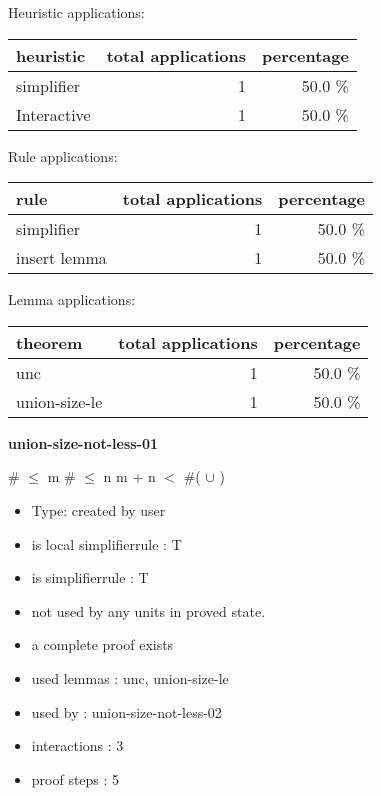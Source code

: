 \documentclass[a4paper]{article}
\begin{document}
\medskip


Heuristic applications:

\begin{supertabular}{l|r|r}
heuristic	& total applications & percentage \\ \hline
simplifier & 1 & 50.0 \% \\
Interactive & 1 & 50.0 \% \\

\end{supertabular}

Rule applications:

\begin{supertabular}{l|r|r}
rule	        & total applications & percentage \\ \hline
simplifier & 1 & 50.0 \% \\
insert lemma & 1 & 50.0 \% \\

\end{supertabular}

Lemma applications:

\begin{supertabular}{l|r|r}
theorem	        & total applications & percentage \\ \hline
unc & 1 & 50.0 \% \\
union-size-le & 1 & 50.0 \% \\

\end{supertabular}
\pagebreak

{\LARGE\bf union-size-not-less-01}\label{lemma-union-size-not-less-01}

\medskip

 \Fol \#  $\le$ m \And \#  $\le$ n \Imp \Not m + n $<$ \#( $\cup$ )

\begin{itemize}

\item Type: created by user

\item is local simplifierrule : T
\item is simplifierrule : T
\item not used by any units in proved state.
\item       a complete proof exists
\item       used lemmas  : unc, union-size-le
\item       used by      : union-size-not-less-02
\item       interactions : 3
\item       proof steps  : 5
\end{itemize}
\end{document}
